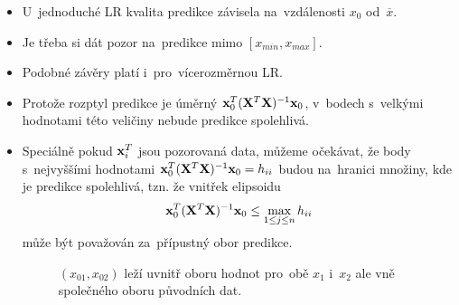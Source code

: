 \begin{description}
\begin{remark}
	    \begin{itemize}
	    \item U~jednoduché LR kvalita predikce závisela na~vzdálenosti $x_0$ od~$\overline{x}$.
	    \item Je třeba si dát pozor na~predikce mimo $[x_{min},x_{max}]$.
	    \item Podobné závěry platí i~pro~vícerozměrnou LR.
	    \item Protože rozptyl predikce je úměrný $\mathbf{x}_0^T(\mathbf{X}^T \mathbf{X})^{-1} \mathbf{x}_0$, v~bodech s~velkými hodnotami této veličiny nebude predikce spolehlivá.
	    \item Speciálně pokud $\mathbf{x}_i^T$ jsou pozorovaná data, můžeme očekávat, že body s~nejvyššími hodnotami $\mathbf{x}_0^T(\mathbf{X}^T \mathbf{X})^{-1} \mathbf{x}_0 = h_{ii}$ budou na~hranici množiny, kde je predikce spolehlivá, tzn. že vnitřek elipsoidu
	 $$
	       \mathbf{x}_0^T(\mathbf{X}^T \mathbf{X})^{-1} \mathbf{x}_0 \leq     \max_{1 \leq j \leq n} h_{ii}
	 $$
	    může být považován za~přípustný obor predikce.
	\begin{figure}[h]
		\centering
	    \caption{ $(x_{01},x_{02})$ leží uvnitř oboru hodnot pro~obě $x_1$ i~$x_2$ ale vně společného oboru původních dat.}
	\end{figure}
\end{itemize}
\end{remark}
\end{description}
